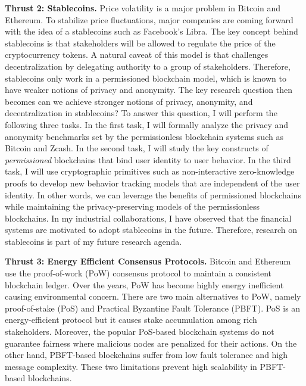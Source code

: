 \documentclass{NSF}
\newcommand{\BfPara}[1]{{\noindent\textbf{#1.}}\xspace}
\begin{document}
\BfPara{Thrust 2: Stablecoins} Price volatility is a major problem in Bitcoin and Ethereum. To stabilize price fluctuations, major companies are coming forward with the idea of a stablecoins such as Facebook's Libra. The key concept behind stablecoins is that stakeholders will be allowed to regulate the price of the cryptocurrency tokens. A natural caveat of this model is that challenges decentralization by delegating authority to a group of stakeholders. Therefore, stablecoins only work in a permissioned blockchain model, which is known to have weaker notions of privacy and anonymity. The key research question then becomes can we achieve stronger notions of privacy, anonymity, and decentralization in stablecoins? To answer this question, I will perform the following three tasks. In the first task, I will formally analyze the privacy and anonymity benchmarks set by the permissionless blockchain systems such as Bitcoin and Zcash. In the second task, I will study the key constructs of {\em permissioned} blockchains that bind user identity to user behavior. In the third task, I will use cryptographic primitives such as non-interactive zero-knowledge proofs to develop new behavior tracking models that are independent of the user identity. In other words, we can leverage the benefits of permissioned blockchains while maintaining the privacy-preserving models of the permissionless blockchains. In my industrial collaborations, I have observed that the financial systems are motivated to adopt stablecoins in the future. Therefore, research on stablecoins is part of my future research agenda. 


\BfPara{Thrust 3: Energy Efficient Consensus Protocols} Bitcoin and Ethereum use the proof-of-work (PoW) consensus protocol to maintain a consistent blockchain ledger. Over the years, PoW has become highly energy inefficient causing environmental concern. There are two main alternatives to PoW, namely proof-of-stake (PoS) and Practical Byzantine Fault Tolerance (PBFT). PoS is an energy-efficient protocol but it causes stake accumulation among rich stakeholders. Moreover, the popular PoS-based blockchain systems do not guarantee fairness where malicious nodes are penalized for their actions. On the other hand, PBFT-based blockchains suffer from low fault tolerance and high message complexity. These two limitations prevent high scalability in PBFT-based blockchains. 
\end{document}
